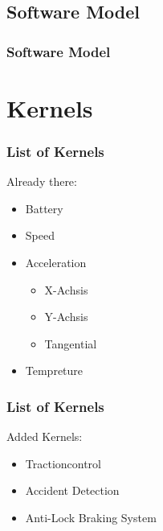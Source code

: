 \documentclass{beamer}
\begin{document}
\subsection{Software Model}
\begin{frame}
    \frametitle{Software Model}
\end{frame}

\section{Kernels}
\begin{frame} %
  \frametitle{List of Kernels} %
  Already there:
  \begin{itemize}
   \item Battery
   \item Speed
   \item Acceleration
   \begin{itemize}
    \item X-Achsis
    \item Y-Achsis
    \item Tangential
   \end{itemize}
   \item Tempreture
  \end{itemize}

\end{frame}
\begin{frame}
    \frametitle{List of Kernels}
    Added Kernels:
    \begin{itemize}
     \item Tractioncontrol
     \item Accident Detection
     \item Anti-Lock Braking System
    \end{itemize}
\end{frame}
\end{document}
